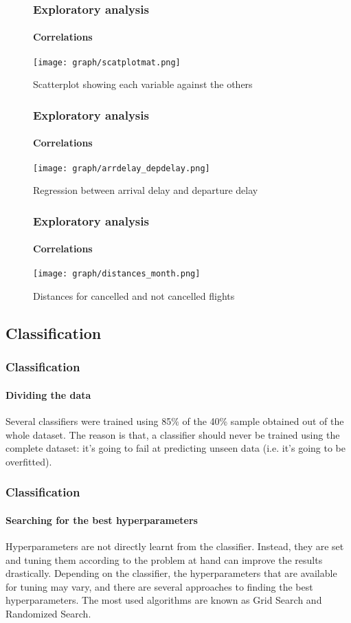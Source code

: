 \documentclass{beamer}
\begin{document}
	\begin{frame}
		\begin{figure}
			\frametitle{Exploratory analysis}
			\framesubtitle{Correlations}
		  \texttt{[image: graph/scatplotmat.png]}
		  \caption{Scatterplot showing each variable against the others}
		  \label{fig:graph1}
		\end{figure}\newline
	\end{frame}
	\begin{frame}
		\begin{figure}
			\frametitle{Exploratory analysis}
			\framesubtitle{Correlations}
		  \texttt{[image: graph/arrdelay\_depdelay.png]}
		  \caption{Regression between arrival delay and departure delay}
		  \label{fig:graph1}
		\end{figure}\newline
	\end{frame}
	\begin{frame}
		\begin{figure}
			\frametitle{Exploratory analysis}
			\framesubtitle{Correlations}
		  \texttt{[image: graph/distances\_month.png]}
		  \caption{Distances for cancelled and not cancelled flights}
		  \label{fig:graph1}
		\end{figure}\newline
	\end{frame}
	\begin{frame}
		\section[Section]{Classification}
		\frametitle{Classification}
		\framesubtitle{Dividing the data}
		Several classifiers were trained using 85\% of the 40\% sample obtained out of the whole dataset. The reason is that, a classifier should never be trained using the complete dataset: it's going to fail at predicting unseen data (i.e. it's going to be overfitted).
	\end{frame}
	\begin{frame}
		\frametitle{Classification}
		\framesubtitle{Searching for the best hyperparameters}
		Hyperparameters are not directly learnt from the classifier. Instead, they are set and tuning them according to the problem at hand can improve the results drastically. Depending on the classifier, the hyperparameters that are available for tuning may vary, and there are several approaches to finding the best hyperparameters. The most used algorithms are known as Grid Search and Randomized Search.
	\end{frame}
\end{document}
